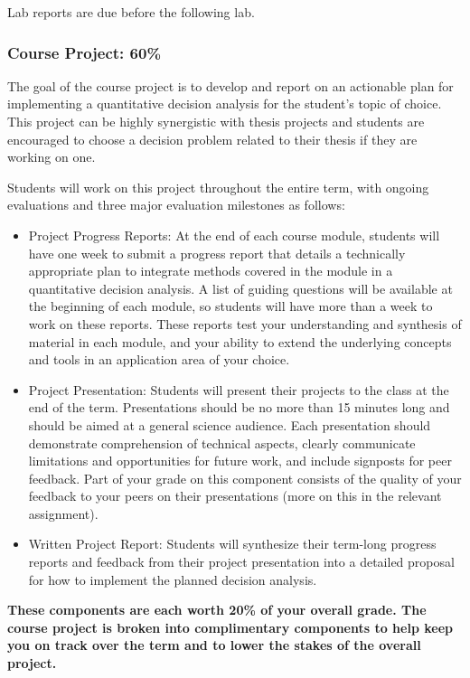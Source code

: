 \documentclass[
  11pt,
]{article}
\providecommand{\tightlist}{%
  \setlength{\itemsep}{0pt}\setlength{\parskip}{0pt}}\usepackage{longtable,booktabs,array}
\begin{document}
Lab reports are due before the following lab.

\subsubsection{Course Project: 60\%}\label{course-project-60}

The goal of the course project is to develop and report on an actionable
plan for implementing a quantitative decision analysis for the student's
topic of choice. This project can be highly synergistic with thesis
projects and students are encouraged to choose a decision problem
related to their thesis if they are working on one.

Students will work on this project throughout the entire term, with
ongoing evaluations and three major evaluation milestones as follows:

\begin{itemize}
\tightlist
\item
  Project Progress Reports: At the end of each course module, students
  will have one week to submit a progress report that details a
  technically appropriate plan to integrate methods covered in the
  module in a quantitative decision analysis. A list of guiding
  questions will be available at the beginning of each module, so
  students will have more than a week to work on these reports. These
  reports test your understanding and synthesis of material in each
  module, and your ability to extend the underlying concepts and tools
  in an application area of your choice.
\item
  Project Presentation: Students will present their projects to the
  class at the end of the term. Presentations should be no more than 15
  minutes long and should be aimed at a general science audience. Each
  presentation should demonstrate comprehension of technical aspects,
  clearly communicate limitations and opportunities for future work, and
  include signposts for peer feedback. Part of your grade on this
  component consists of the quality of your feedback to your peers on
  their presentations (more on this in the relevant assignment).
\item
  Written Project Report: Students will synthesize their term-long
  progress reports and feedback from their project presentation into a
  detailed proposal for how to implement the planned decision analysis.
\end{itemize}

\textbf{These components are each worth 20\% of your overall grade. The
course project is broken into complimentary components to help keep you
on track over the term and to lower the stakes of the overall project.}
\end{document}

